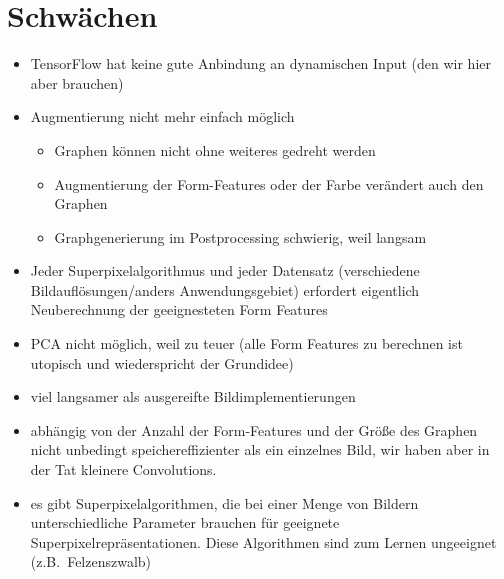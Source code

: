 \section{Schwächen}

\begin{itemize}
  \item TensorFlow hat keine gute Anbindung an dynamischen Input (den wir hier aber brauchen)
  \item Augmentierung nicht mehr einfach möglich
  \begin{itemize}
    \item Graphen können nicht ohne weiteres gedreht werden
    \item Augmentierung der Form-Features oder der Farbe verändert auch den Graphen
    \item Graphgenerierung im Postprocessing schwierig, weil langsam
  \end{itemize}
\item Jeder Superpixelalgorithmus und jeder Datensatz (verschiedene Bildauflösungen/anders Anwendungsgebiet) erfordert eigentlich Neuberechnung der geeignesteten Form Features
  \item PCA nicht möglich, weil zu teuer (alle Form Features zu berechnen ist utopisch und wiederspricht der Grundidee)
  \item viel langsamer als ausgereifte Bildimplementierungen
  \item abhängig von der Anzahl der Form-Features und der Größe des Graphen nicht unbedingt speichereffizienter als ein einzelnes Bild, wir haben aber in der Tat kleinere Convolutions.
  \item es gibt Superpixelalgorithmen, die bei einer Menge von Bildern unterschiedliche Parameter brauchen für geeignete Superpixelrepräsentationen.
    Diese Algorithmen sind zum Lernen ungeeignet (z.B.\ Felzenszwalb)
\end{itemize}
